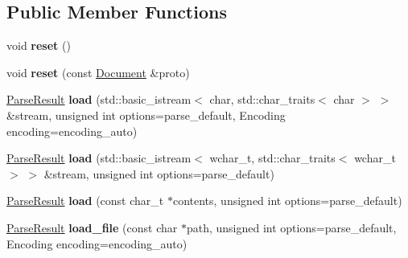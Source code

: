 \subsection*{Public Member Functions}
\begin{DoxyCompactItemize}
\item 
\hypertarget{classphys_1_1xml_1_1Document_aadb3e68da9cf95b1193f915136f9a7e5}{
void {\bfseries reset} ()}
\label{dd/d44/classphys_1_1xml_1_1Document_aadb3e68da9cf95b1193f915136f9a7e5}

\item 
\hypertarget{classphys_1_1xml_1_1Document_a8d79b0e71457e8a64f331fd4cc117a86}{
void {\bfseries reset} (const \hyperlink{classphys_1_1xml_1_1Document}{Document} \&proto)}
\label{dd/d44/classphys_1_1xml_1_1Document_a8d79b0e71457e8a64f331fd4cc117a86}

\item 
\hypertarget{classphys_1_1xml_1_1Document_ad4b3c84acf2aa57f4ff0a14a1454fdcc}{
\hyperlink{structphys_1_1xml_1_1ParseResult}{ParseResult} {\bfseries load} (std::basic\_\-istream$<$ char, std::char\_\-traits$<$ char $>$ $>$ \&stream, unsigned int options=parse\_\-default, Encoding encoding=encoding\_\-auto)}
\label{dd/d44/classphys_1_1xml_1_1Document_ad4b3c84acf2aa57f4ff0a14a1454fdcc}

\item 
\hypertarget{classphys_1_1xml_1_1Document_a09d74505371b5746d4762daa20a7bb25}{
\hyperlink{structphys_1_1xml_1_1ParseResult}{ParseResult} {\bfseries load} (std::basic\_\-istream$<$ wchar\_\-t, std::char\_\-traits$<$ wchar\_\-t $>$ $>$ \&stream, unsigned int options=parse\_\-default)}
\label{dd/d44/classphys_1_1xml_1_1Document_a09d74505371b5746d4762daa20a7bb25}

\item 
\hypertarget{classphys_1_1xml_1_1Document_a1551e495e2b83897bd8288fc001c6c54}{
\hyperlink{structphys_1_1xml_1_1ParseResult}{ParseResult} {\bfseries load} (const char\_\-t $\ast$contents, unsigned int options=parse\_\-default)}
\label{dd/d44/classphys_1_1xml_1_1Document_a1551e495e2b83897bd8288fc001c6c54}

\item 
\hypertarget{classphys_1_1xml_1_1Document_af208b8bc540a1380c0661ea182f8ee8b}{
\hyperlink{structphys_1_1xml_1_1ParseResult}{ParseResult} {\bfseries load\_\-file} (const char $\ast$path, unsigned int options=parse\_\-default, Encoding encoding=encoding\_\-auto)}
\label{dd/d44/classphys_1_1xml_1_1Document_af208b8bc540a1380c0661ea182f8ee8b}


\end{DoxyCompactItemize}
